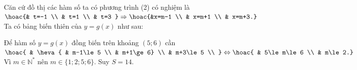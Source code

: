 \begin{ex}
{ Căn cứ đồ thị các hàm số ta có phương trình (2) có nghiệm là $\hoac{& t=-1 \\ 
 & t=1 \\ 
 & t=3 }
 \Rightarrow\hoac{&x=m-1 \\ 
 & x=m+1 \\ 
 & x=m+3.}$\\
 Ta có bảng biến thiên của $y=g(x)$ như sau:
 \begin{center}
 \end{center}
 Để hàm số $y=g(x)$ đồng biến trên khoảng $(5;6)$ cần 
 $\hoac{
 & \heva{
 & m-1\le 5 \\ 
 & m+1\ge 6} \\ 
 & m+3\le 5 \\ }\Leftrightarrow \hoac{
 & 5\le m\le 6 \\ 
 & m\le 2.}$\\
 Vì $m\in \mathbb{N}^*$ nên $m\in \big\{1;2;5;6\big\}$. Suy 
 $S=14$.
 }
\end{ex}

